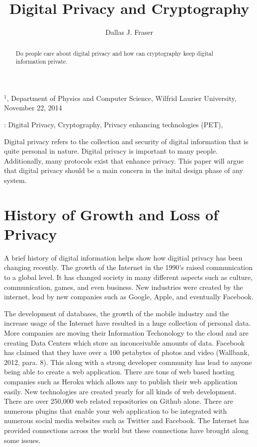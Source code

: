 \documentclass[12pt]{article}
\title{Digital Privacy and Cryptography}
\author{
	Dallas J. Fraser\inst{1}
}
\def\inst#1{$^{#1}$}
\begin{document}
\maketitle

\begin{center}
{\footnotesize

\inst{1}, Department of Physics and Computer Science, Wilfrid Laurier 
University, November 22, 2014}

\end{center}

\begin{abstract}
Do people care about digital privacy and how can cryptography keep digital information private.
\end{abstract}

: Digital Privacy, Cryptography, Privacy enhancing technologies (PET),

\clearpage

Digital privacy refers to the collection and security of digital information that is quite personal in nature. Digital privacy is important to many people. Additionally, many protocols exist that enhance privacy. This paper will argue that digital privacy should be a main concern in the inital design phase of any system. 

\section{History of Growth and Loss of Privacy}\label{sec:history}

A brief history of digital information helps show how digitial privacy has been changing recently. The growth of the Internet in the 1990's raised communication to a global level. It has changed society in many different aspects such as culture, communication, games, and even business. New industries were created by the internet, lead by new companies such as Google, Apple, and eventually Facebook.

The development of databases, the growth of the mobile industry  and the increase usage of the Internet have resulted in a huge collection of personal data. More companies are moving their Information Techonology to the cloud and are creating Data Centers which store an inconceivable amounts of data. Facebook has claimed that they have over a 100 petabytes of photos and video (Wallbank, 2012, para. 8). This along with a strong developer community has lead to anyone being able to create a web application. There are tons of web based hosting companies such as Heroku which allows any to publish their web application easily. New technologies are created yearly for all kinds of web development. There are over 250,000 web related repositories on Github alone. There are numerous plugins that enable your web application to be integrated with numerous social media websites such as Twitter and Facebook. The Internet has provided connections across the world but these connections have brought along some issues.
\end{document}
